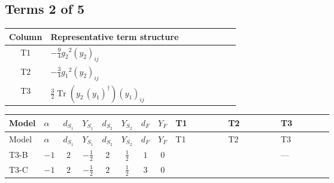 \documentclass[8pt]{article}
\begin{document}
\begin{landscape}
\subsection*{Terms 2 of 5}
\begin{center}
\begin{tabular}{@{}c >{\raggedright\arraybackslash}p{0.82\linewidth}@{}}
\toprule
Column & Representative term structure \\
\midrule
T1 & \(\displaystyle -\frac{9}{4} {g_2}^2 \left({y_2}\right)_{ij}\) \\
\midrule
T2 & \(\displaystyle -\frac{3}{4} {g_1}^2 \left({y_2}\right)_{ij}\) \\
\midrule
T3 & \(\displaystyle \frac{3}{2} \operatorname{Tr}\!\left({y_2}\,\left({y_1}\right)^{\dagger}\right) \left({y_1}\right)_{ij}\) \\
\midrule
\bottomrule
\end{tabular}
\end{center}
\smallskip
\tiny
\begin{longtable}{@{}llcccccc >{\raggedright\arraybackslash}p{0.21\linewidth} >{\raggedright\arraybackslash}p{0.21\linewidth} >{\raggedright\arraybackslash}p{0.21\linewidth}@{}}
\toprule
Model & $\alpha$ & $d_{S_1}$ & $Y_{S_1}$ & $d_{S_2}$ & $Y_{S_2}$ & $d_F$ & $Y_F$ & T1 & T2 & T3 \\
\midrule
\endfirsthead
\toprule
Model & $\alpha$ & $d_{S_1}$ & $Y_{S_1}$ & $d_{S_2}$ & $Y_{S_2}$ & $d_F$ & $Y_F$ & T1 & T2 & T3 \\
\midrule
\endhead
T3-B & $-1$ & $2$ & $-\frac{1}{2}$ & $2$ & $\frac{1}{2}$ & $1$ & $0$ & \scriptsize\adjustbox{max width=\linewidth}{$\begin{gathered} -\frac{9}{4} {g_2}^2 \left({y_2}\right)_{ij}\end{gathered}$} & \scriptsize\adjustbox{max width=\linewidth}{$\begin{gathered} -\frac{3}{4} {g_1}^2 \left({y_2}\right)_{ij}\end{gathered}$} & --- \\
\midrule
T3-C & $-1$ & $2$ & $-\frac{1}{2}$ & $2$ & $\frac{1}{2}$ & $3$ & $0$ & \scriptsize\adjustbox{max width=\linewidth}{$\begin{gathered} -\frac{33}{4} {g_2}^2 \left({y_2}\right)_{ij}\end{gathered}$} & \scriptsize\adjustbox{max width=\linewidth}{$\begin{gathered} -\frac{3}{4} {g_1}^2 \left({y_2}\right)_{ij}\end{gathered}$} & \scriptsize\adjustbox{max width=\linewidth}{$\begin{gathered} \frac{3}{2} \operatorname{Tr}\!\left({y_2}\,\left({y_1}\right)^{\dagger}\right) \left({y_1}\right)_{ij}\end{gathered}$} \\

\end{longtable}
\end{landscape}
\end{document}
